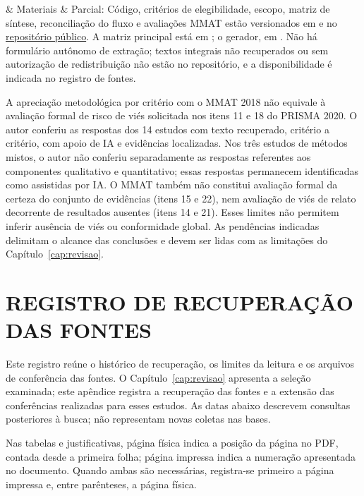 \begin{apendicesenv}
\begin{longtable}
 & Materiais & Parcial: Código, critérios de elegibilidade, escopo, matriz de síntese, reconciliação do fluxo e avaliações MMAT estão versionados em  e  no \href{https://github.com/thalesfb/ccw/tree/19880fd1388edc3084f905161117cc76c8abbf1f/research}{repositório público}. A matriz principal está em ; o gerador, em . Não há formulário autônomo de extração; textos integrais não recuperados ou sem autorização de redistribuição não estão no repositório, e a disponibilidade é indicada no registro de fontes. \\
\hline
\end{longtable}
\endgroup

A apreciação metodológica por critério com o MMAT 2018 não equivale à avaliação formal de risco de viés solicitada nos itens 11 e 18 do PRISMA 2020. O autor conferiu as respostas dos 14 estudos com texto recuperado, critério a critério, com apoio de IA e evidências localizadas. Nos três estudos de métodos mistos, o autor não conferiu separadamente as respostas referentes aos componentes qualitativo e quantitativo; essas respostas permanecem identificadas como assistidas por IA. O MMAT também não constitui avaliação formal da certeza do conjunto de evidências (itens 15 e 22), nem avaliação de viés de relato decorrente de resultados ausentes (itens 14 e 21). Esses limites não permitem inferir ausência de viés ou conformidade global. As pendências indicadas delimitam o alcance das conclusões e devem ser lidas com as limitações do Capítulo~\ref{cap:revisao}.


\chapter{REGISTRO DE RECUPERAÇÃO DAS FONTES}
\label{apendice:recuperacao-fontes}

Este registro reúne o histórico de recuperação, os limites da leitura e os arquivos de conferência das fontes. O Capítulo~\ref{cap:revisao} apresenta a seleção examinada; este apêndice registra a recuperação das fontes e a extensão das conferências realizadas para esses estudos. As datas abaixo descrevem consultas posteriores à busca; não representam novas coletas nas bases.

Nas tabelas e justificativas, página física indica a posição da página no PDF, contada desde a primeira folha; página impressa indica a numeração apresentada no documento. Quando ambas são necessárias, registra-se primeiro a página impressa e, entre parênteses, a página física.


\end{apendicesenv}
